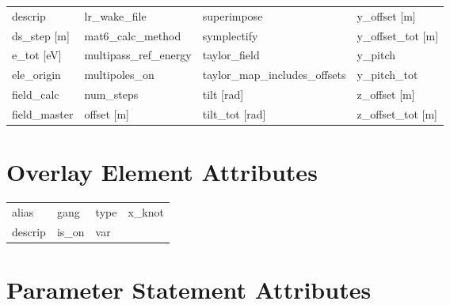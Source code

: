 \begin{tabular}{llll}
descrip                          & lr_wake_file                     & superimpose                      & y_offset [m]                     \\
ds_step [m]                      & mat6_calc_method                 & symplectify                      & y_offset_tot [m]                 \\
e_tot [eV]                       & multipass_ref_energy             & taylor_field                     & y_pitch                          \\
ele_origin                       & multipoles_on                    & taylor_map_includes_offsets      & y_pitch_tot                      \\
field_calc                       & num_steps                        & tilt [rad]                       & z_offset [m]                     \\
field_master                     & offset [m]                       & tilt_tot [rad]                   & z_offset_tot [m]                 \\
 \bottomrule
 \end{tabular}
 \vfill
 
 \section{Overlay Element Attributes}
 \label{s:list.overlay}
 
 \begin{tabular}{llll} \toprule
alias                            & gang                             & type                             & x_knot                           \\
descrip                          & is_on                            & var                              &                                  \\
 \bottomrule
 \end{tabular}
 \vfill
 
 \section{Parameter Statement Attributes}
 \label{s:list.parameter}
 
